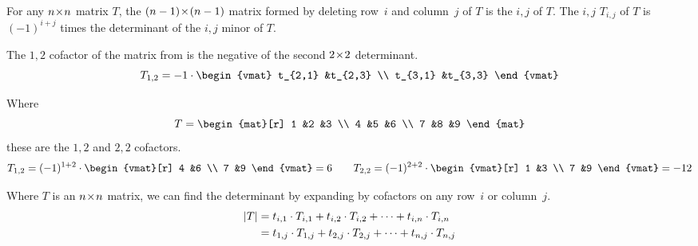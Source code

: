 \begin{definition}
For any \( n \! \times \! n \) matrix \( T \), the \( (n-1) \! \times \! (n-1) \) matrix formed by
deleting row~\( i \) and column~\( j \) of \( T \) is the
\( i,j \) %
of \( T \).
The \( i,j \) %
\( T_{i,j} \) of \( T \) is
\( (-1)^{i+j} \) times the determinant of the \( i,j \) minor of \( T \).
\end{definition}

\begin{example}
The $1,2$ cofactor of the matrix from 
is the negative of the second $2 \! \times \! 2$ determinant.
\begin{equation*}
  T_{1,2}=
  -1\cdot\begin{vmat}
    t_{2,1}  &t_{2,3}  \\
    t_{3,1}  &t_{3,3}
  \end{vmat}
\end{equation*}
\end{example}

\begin{example}
Where
\begin{equation*}
   T=
   \begin{mat}[r]
      1  &2  &3  \\
      4  &5  &6  \\
      7  &8  &9
   \end{mat}
\end{equation*}
these are the  \( 1,2 \) and \( 2,2 \) cofactors.
\begin{equation*}
   T_{1,2}=
   (-1)^{1+2}\cdot\begin{vmat}[r]
                4  &6  \\
                7  &9
             \end{vmat}=6
  \qquad
   T_{2,2}=
   (-1)^{2+2}\cdot\begin{vmat}[r]
                1  &3  \\
                7  &9
             \end{vmat}=-12
\end{equation*}
\end{example}

\begin{theorem}
\label{th:LaPlaceExp}
%
Where \( T \) is an \( n \! \times \! n \) matrix, we can find
the determinant by expanding by cofactors on any
row~$i$ or column~$j$.
\begin{align*}
   \deter{T}
   &=t_{i,1}\cdot T_{i,1}+t_{i,2}\cdot T_{i,2}+\cdots+t_{i,n}\cdot T_{i,n}  \\
   &=t_{1,j}\cdot T_{1,j}+t_{2,j}\cdot T_{2,j}+\cdots+t_{n,j}\cdot T_{n,j}
\end{align*}
\end{theorem}

